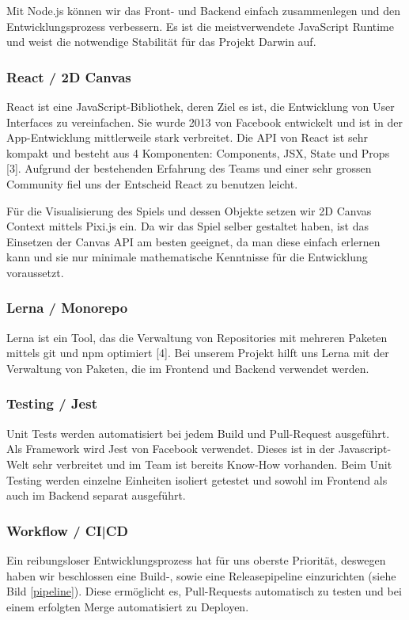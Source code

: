 \documentclass[11pt,a4paper,titlepage]{article}
\begin{document}
Mit Node.js können wir das Front- und Backend einfach zusammenlegen und den Entwicklungsprozess verbessern. Es ist die meistverwendete JavaScript Runtime und weist die notwendige Stabilität für das Projekt Darwin auf.

\subsubsection{React / 2D Canvas}
React ist eine JavaScript-Bibliothek, deren Ziel es ist, die Entwicklung von User Interfaces zu vereinfachen. Sie wurde 2013 von Facebook entwickelt und ist in der App-Entwicklung mittlerweile stark verbreitet.
Die API von React ist sehr kompakt und besteht aus 4 Komponenten: Components, JSX, State und Props [3].
Aufgrund der bestehenden Erfahrung des Teams und einer sehr grossen Community fiel uns der Entscheid React zu benutzen leicht.

Für die Visualisierung des Spiels und dessen Objekte setzen wir 2D Canvas Context mittels Pixi.js ein. Da wir das Spiel selber gestaltet haben, ist das Einsetzen der Canvas API am besten geeignet, da man diese einfach erlernen kann und sie nur minimale mathematische Kenntnisse für die Entwicklung voraussetzt.

\subsubsection{Lerna / Monorepo}
Lerna ist ein Tool, das die Verwaltung von Repositories mit mehreren Paketen mittels git und npm optimiert [4]. Bei unserem Projekt hilft uns Lerna mit der Verwaltung von Paketen, die im Frontend und Backend verwendet werden.

\subsubsection{Testing / Jest}
Unit Tests werden automatisiert bei jedem Build und Pull-Request ausgeführt.
Als Framework wird Jest von Facebook verwendet. Dieses ist in der Javascript-Welt sehr verbreitet und im Team ist bereits Know-How vorhanden.
Beim Unit Testing werden einzelne Einheiten isoliert getestet und sowohl im Frontend als auch im Backend separat ausgeführt.

\subsubsection{Workflow / CI|CD}
Ein reibungsloser Entwicklungsprozess hat für uns oberste Priorität, deswegen haben wir beschlossen eine Build-, sowie eine Releasepipeline einzurichten (siehe Bild \ref{pipeline}). Diese ermöglicht es, Pull-Requests automatisch zu testen und bei einem erfolgten Merge automatisiert zu Deployen.
\end{document}
